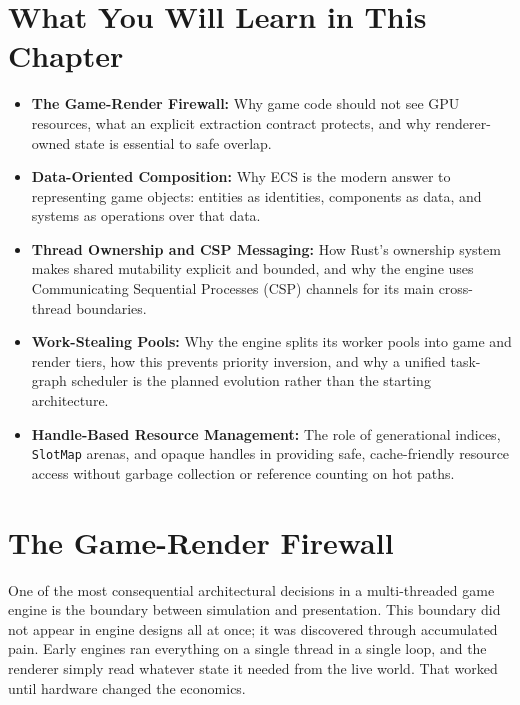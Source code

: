 \documentclass[
  11pt,
  letterpaper,
  DIV=11,
  numbers=noendperiod,
  twoside,
  open=right]{scrreprt}
\providecommand{\tightlist}{%
  \setlength{\itemsep}{0pt}\setlength{\parskip}{0pt}}
\begin{document}
\section*{What You Will Learn in This
Chapter}\label{what-you-will-learn-in-this-chapter-2}


\begin{itemize}
\tightlist
\item
  \textbf{The Game-Render Firewall:} Why game code should not see GPU
  resources, what an explicit extraction contract protects, and why
  renderer-owned state is essential to safe overlap.
\item
  \textbf{Data-Oriented Composition:} Why ECS is the modern answer to
  representing game objects: entities as identities, components as data,
  and systems as operations over that data.
\item
  \textbf{Thread Ownership and CSP Messaging:} How Rust's ownership
  system makes shared mutability explicit and bounded, and why the
  engine uses Communicating Sequential Processes (CSP) channels for its
  main cross-thread boundaries.
\item
  \textbf{Work-Stealing Pools:} Why the engine splits its worker pools
  into game and render tiers, how this prevents priority inversion, and
  why a unified task-graph scheduler is the planned evolution rather
  than the starting architecture.
\item
  \textbf{Handle-Based Resource Management:} The role of generational
  indices, \texttt{SlotMap} arenas, and opaque handles in providing
  safe, cache-friendly resource access without garbage collection or
  reference counting on hot paths.
\end{itemize}

\section{The Game-Render Firewall}\label{the-game-render-firewall}

One of the most consequential architectural decisions in a
multi-threaded game engine is the boundary between simulation and
presentation. This boundary did not appear in engine designs all at
once; it was discovered through accumulated pain. Early engines ran
everything on a single thread in a single loop, and the renderer simply
read whatever state it needed from the live world. That worked until
hardware changed the economics.
\end{document}
